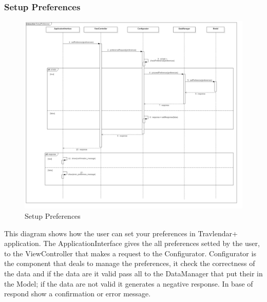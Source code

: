 \subsubsection{Setup Preferences}
\begin{figure}[H]
\centering
\includegraphics[scale=0.25]{images/SetupPreference}
\caption{Setup Preferences}
\end{figure}This diagram shows how the user can set your preferences in Travlendar+ application. The ApplicationInterface gives the all preferences setted by the user, to the ViewController that makes a request to the Configurator. Configurator is the component that deals to manage the preferences, it check the correctness of the data and if the data are it valid pass all to the DataManager that put their in the Model; if the data are not valid it generates a negative response. In base of respond show a confirmation or error message.

